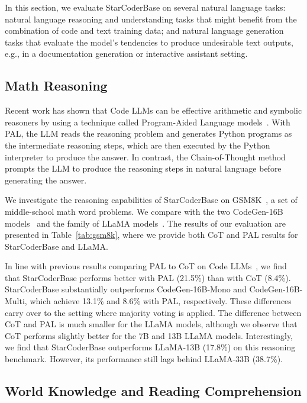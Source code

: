 In this section, we evaluate StarCoderBase on several natural language tasks: natural language reasoning and understanding tasks that might benefit from the combination of code and text training data; and natural language generation tasks that evaluate the model's tendencies to produce undesirable text outputs, e.g., in a documentation generation or interactive assistant setting.

\subsection{Math Reasoning}

Recent work has shown that Code LLMs can be effective arithmetic and symbolic reasoners by using a technique called Program-Aided Language models~\citep[PAL;][]{gao2022pal}. With PAL, the LLM reads the reasoning problem and generates Python programs as the intermediate reasoning steps, which are then executed by the Python  interpreter to produce the answer. In contrast, the Chain-of-Thought method~\citep[CoT;][]{wei2022chain} prompts the LLM to produce the reasoning steps in natural language before generating the answer.  

We investigate the reasoning capabilities of StarCoderBase on GSM8K~\citep{cobbe2021training}, a set of middle-school math word problems. We compare with the two CodeGen-16B models~\citep{nijkamp:codegen} and the family of LLaMA models~\citep{touvron2023llama}. The results of our evaluation are presented in Table~\ref{tab:gsm8k}, where we provide both CoT and PAL results for StarCoderBase and LLaMA.

In line with previous results comparing PAL to CoT on Code LLMs~\citep{gao2022pal}, we find that StarCoderBase performs better with PAL (21.5\%) than with CoT (8.4\%). StarCoderBase substantially outperforms CodeGen-16B-Mono and CodeGen-16B-Multi, which achieve 13.1\% and 8.6\% with PAL, respectively. These differences carry over to the setting where majority voting is applied.  The difference between CoT and PAL is much smaller for the LLaMA models, although we observe that CoT performs slightly better for the 7B and 13B LLaMA models. Interestingly, we find that StarCoderBase outperforms LLaMA-13B (17.8\%) on this reasoning benchmark. However, its performance still lags behind LLaMA-33B (38.7\%).   

\subsection{World Knowledge and Reading Comprehension}

